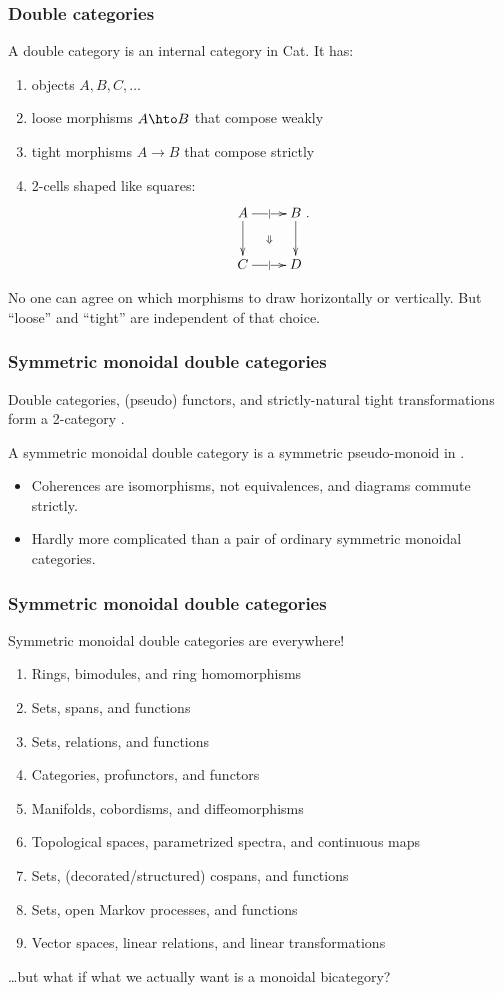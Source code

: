 \documentclass{beamer}
\begin{document}
\begin{frame}
  \frametitle{Double categories}
  A \alert{double category} is an internal category in Cat.
  It has:
  \begin{enumerate}
  \item objects $A,B,C,\dots$
  \item \alert{loose} morphisms $A\hto B$ that compose weakly
  \item \alert{tight} morphisms $A\to B$ that compose strictly
  \item 2-cells shaped like squares:
    \begin{equation}\label{eq:square}
      \xymatrix{
        A \ar[r]|{|}  \ar[d] \ar@{}[dr]|{\Downarrow}&
        B\ar[d]\\
        C \ar[r]|{|} & D
      }.
    \end{equation}
  \end{enumerate}
  No one can agree on which morphisms to draw horizontally or vertically.
  But ``loose'' and ``tight'' are independent of that choice.
\end{frame}

\begin{frame}
  \frametitle{Symmetric monoidal double categories}
  Double categories, (pseudo) functors, and strictly-natural tight transformations form a 2-category \cDbl.
  \begin{definition}
    A \alert{symmetric monoidal double category} is a symmetric pseudo-monoid in \cDbl.
  \end{definition}
  \begin{itemize}
  \item Coherences are isomorphisms, not equivalences, and diagrams commute strictly.
  \item Hardly more complicated than a pair of ordinary symmetric monoidal categories.
  \end{itemize}
\end{frame}

\begin{frame}
  \frametitle{Symmetric monoidal double categories}
  Symmetric monoidal double categories are everywhere!
  \begin{enumerate}
  \item Rings, bimodules, and ring homomorphisms
  \item Sets, spans, and functions
  \item Sets, relations, and functions
  \item Categories, profunctors, and functors
  \item Manifolds, cobordisms, and diffeomorphisms
  \item Topological spaces, parametrized spectra, and continuous maps
  \item Sets, (decorated/structured) cospans, and functions
  \item Sets, open Markov processes, and functions
  \item Vector spaces, linear relations, and linear transformations
  \end{enumerate}
  \dots but what if what we actually \alert{want} is a monoidal \alert{bicategory}?
\end{frame}
\end{document}
